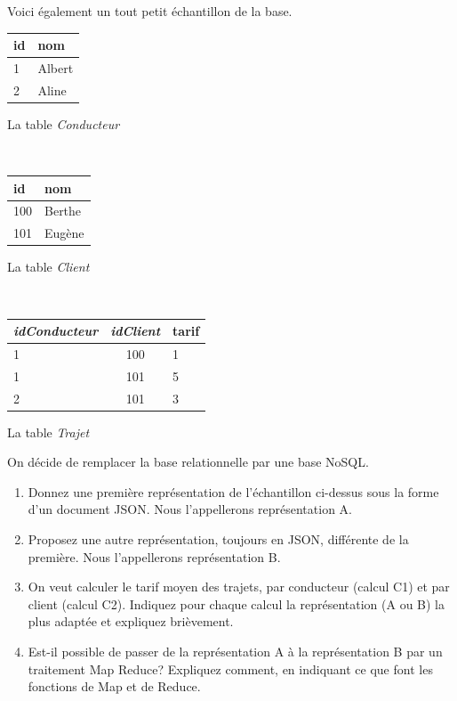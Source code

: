 \documentclass[11pt,a4paper]{article}
\newcommand{\cle}[1]{\textbf{#1}}
\def\fk#1{\textit{#1}}
\def\tble#1{\textit{#1}}
\begin{document}
Voici également un tout petit échantillon de la base.

\vspace*{0.2cm}
\begin{minipage}[b]{2.5cm}
\begin{tabular}{l|l}
\cle{id} & nom\\
\hline
1 & Albert\\
2 & Aline\\
\hline
\end{tabular}

\centerline{La table \tble{Conducteur}}
\end{minipage} \hspace*{0.5cm} \
\begin{minipage}[b]{3cm}
\begin{tabular}{l|l}
\cle{id} &  nom  \\
\hline
100 & Berthe\\
101 & Eugène \\
\hline
\end{tabular}

\centerline{La table \tble{Client}}
\end{minipage} \hspace*{0.3cm} \
\begin{minipage}[b]{3cm}
\begin{tabular}{l|c|l}
\cle{\fk{idConducteur}} & \cle{\fk{idClient}}  & tarif \\
\hline
1  & 100  & 1 \\
1 & 101  & 5 \\
2 & 101  & 3 \\
\hline
\end{tabular}

\centerline{La table \tble{Trajet}}
\end{minipage}

\vspace*{0.2cm}

On décide de remplacer la base relationnelle par une base NoSQL. 

\begin{enumerate}
  \item Donnez une première représentation de l'échantillon ci-dessus sous la forme d'un document JSON. 
      Nous l'appellerons représentation A.
  \item Proposez une autre représentation, toujours en JSON, différente de la première.  
  Nous l'appellerons représentation B.
  \item On veut calculer le tarif moyen des trajets, par conducteur (calcul C1) et par client (calcul C2).
      Indiquez pour chaque calcul la représentation (A ou B) la plus adaptée et expliquez brièvement.
     \item Est-il possible de passer de la représentation A à la représentation B par un traitement
        Map Reduce? Expliquez comment, en indiquant ce que font les fonctions de Map et de Reduce.
\end{enumerate}
\end{document}
